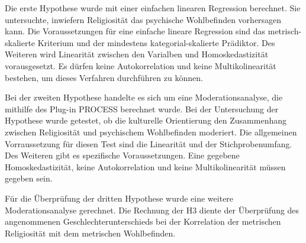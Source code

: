 Die erste Hypothese wurde mit einer einfachen linearen Regression berechnet. Sie untersuchte, inwiefern Religiosität das psychische Wohlbefinden vorhersagen kann. Die Voraussetzungen für eine einfache lineare Regression sind das metrisch-skalierte Kriterium und der mindestens kategorial-skalierte Prädiktor. Des Weiteren wird Linearität zwischen den Varialben und Homoskedastizität vorausgesetzt. Es dürfen keine Autokorrelation und keine Multikolinearität bestehen, um dieses Verfahren durchführen zu können.

Bei der zweiten Hypothese handelte es sich um eine Moderationsanalyse, die mithilfe des Plug-in PROCESS berechnet wurde. Bei der Untersuchung der Hypothese wurde getestet, ob die kulturelle Orientierung den Zusammenhang zwischen Religiosität und psychischem Wohlbefinden moderiert. Die allgemeinen Vorraussetzung für diesen Test sind die Linearität und der Stichprobenumfang. Des Weiteren gibt es spezifische Voraussetzungen. Eine gegebene Homoskedastizität, keine Autokorrelation und keine Multikolinearität müssen gegeben sein. 

Für die Überprüfung der dritten Hypothese wurde eine weitere Moderationsanalyse gerechnet. Die Rechnung der H3 diente der Überprüfung des angenommenen Geschlechterunterschieds bei der Korrelation der metrischen Religiosität mit dem metrischen Wohlbefinden. 